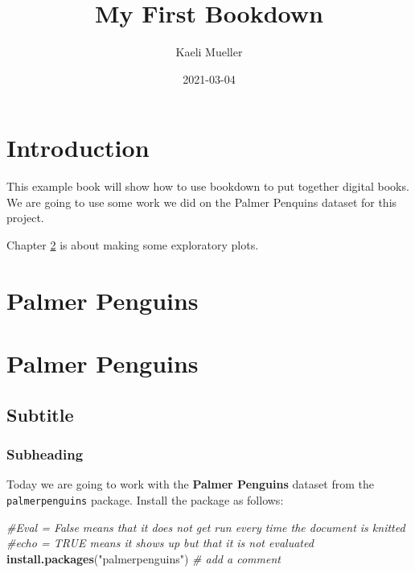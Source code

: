 \documentclass[
]{book}
\title{My First Bookdown}
\author{Kaeli Mueller}
\date{2021-03-04}
\newenvironment{Shaded}{\begin{snugshade}}{\end{snugshade}}
\newcommand{\CommentTok}[1]{\textcolor[rgb]{0.56,0.35,0.01}{\textit{#1}}}
\newcommand{\KeywordTok}[1]{\textcolor[rgb]{0.13,0.29,0.53}{\textbf{#1}}}
\newcommand{\NormalTok}[1]{#1}
\newcommand{\StringTok}[1]{\textcolor[rgb]{0.31,0.60,0.02}{#1}}
\begin{document}
\maketitle

{
\setcounter{tocdepth}{1}
\tableofcontents
}
\hypertarget{introduction}{%
\chapter{Introduction}\label{introduction}}

This example book will show how to use bookdown to put together digital books. We are going to use some work we did on the Palmer Penquins dataset for this project.

Chapter \ref{penguins} is about making some exploratory plots.

\hypertarget{penguins}{%
\chapter{Palmer Penguins}\label{penguins}}

\hypertarget{palmer-penguins}{%
\chapter{Palmer Penguins}\label{palmer-penguins}}

\hypertarget{subtitle}{%
\section{Subtitle}\label{subtitle}}

\hypertarget{subheading}{%
\subsection{Subheading}\label{subheading}}

Today we are going to work with the \textbf{Palmer Penguins} dataset from the \texttt{palmerpenguins}
package. Install the package as follows:

\begin{Shaded}
\begin{Highlighting}[]
\CommentTok{#Eval = False means that it does not get run every time the document is knitted}
\CommentTok{#echo = TRUE  means it shows up but that it is not evaluated}
\KeywordTok{install.packages}\NormalTok{(}\StringTok{"palmerpenguins"}\NormalTok{) }\CommentTok{# add a comment}
\end{Highlighting}
\end{Shaded}
\end{document}
